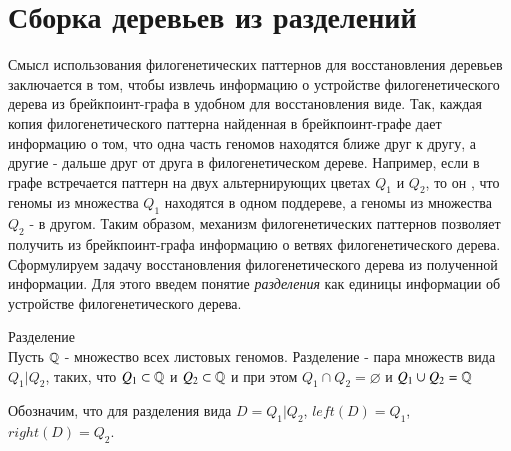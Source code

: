 \section{Сборка деревьев из разделений}
Смысл использования филогенетических паттернов для восстановления деревьев заключается в том,
чтобы извлечь информацию о устройстве филогенетического дерева из брейкпоинт-графа в удобном для восстановления виде.
Так, каждая копия филогенетического паттерна найденная в брейкпоинт-графе дает информацию о том,
что одна часть геномов находятся ближе друг к другу, а другие - дальше друг от друга в филогенетическом дереве.
Например, если в графе встречается паттерн  на двух альтернирующих цветах $Q_1$ и $Q_2$, то он ,
что геномы из множества $Q_1$ находятся в одном поддереве, а геномы из множества $Q_2$ - в другом.
Таким образом, механизм филогенетических паттернов позволяет получить из брейкпоинт-графа информацию о ветвях филогенетического дерева.
Сформулируем задачу восстановления филогенетического дерева из полученной информации.
Для этого введем понятие \textit{разделения} как единицы информации об устройстве филогенетического дерева.
\begin{define}{Разделение} \\
  Пусть $\mathbb{Q}$ - множество всех листовых геномов.
  Разделение - пара множеств вида $Q_1|Q_2$, таких, что $Q_1 \subset \mathbb{Q}$ и $Q_2 \subset \mathbb{Q}$ и при этом
  $Q_1 \cap Q_2 = \varnothing$ и $Q_1 \cup Q_2 = \mathbb{Q}$
\end{define}
Обозначим, что для разделения вида $D = Q_1|Q_2$, $left(D) = Q_1$, $right(D) = Q_2$.


